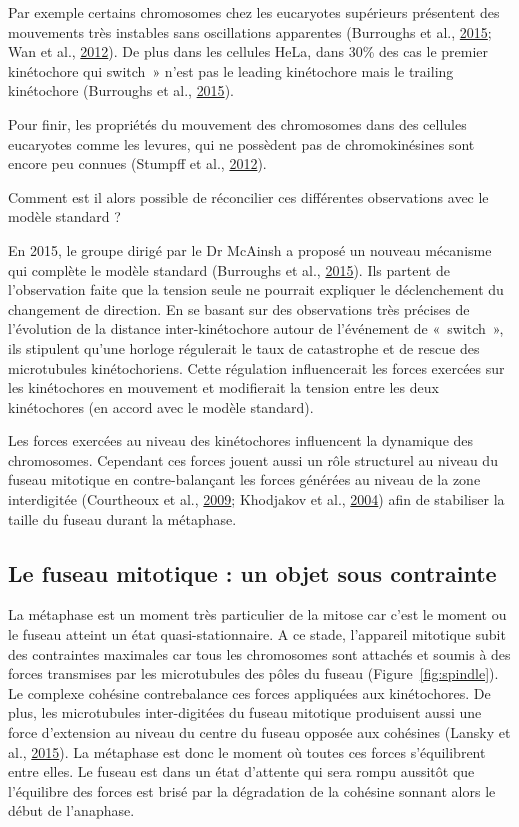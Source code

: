 \documentclass[12pt,a4paper,twoside,openright]{book}
\begin{document}
Par exemple certains chromosomes chez les eucaryotes supérieurs
présentent des mouvements très instables sans oscillations apparentes
(Burroughs et al., \protect\hyperlink{ref-Burroughs2015}{2015}; Wan et
al., \protect\hyperlink{ref-Wan2012}{2012}). De plus dans les cellules
HeLa, dans 30\% des cas le premier kinétochore qui switch~» n'est pas le
leading kinétochore mais le trailing kinétochore (Burroughs et al.,
\protect\hyperlink{ref-Burroughs2015}{2015}).

Pour finir, les propriétés du mouvement des chromosomes dans des
cellules eucaryotes comme les levures, qui ne possèdent pas de
chromokinésines sont encore peu connues (Stumpff et al.,
\protect\hyperlink{ref-Stumpff2012}{2012}).

Comment est il alors possible de réconcilier ces différentes
observations avec le modèle standard ?

En 2015, le groupe dirigé par le Dr McAinsh a proposé un nouveau
mécanisme qui complète le modèle standard (Burroughs et al.,
\protect\hyperlink{ref-Burroughs2015}{2015}). Ils partent de
l'observation faite que la tension seule ne pourrait expliquer le
déclenchement du changement de direction. En se basant sur des
observations très précises de l'évolution de la distance
inter-kinétochore autour de l'événement de «~switch~», ils stipulent
qu'une horloge régulerait le taux de catastrophe et de rescue des
microtubules kinétochoriens. Cette régulation influencerait les forces
exercées sur les kinétochores en mouvement et modifierait la tension
entre les deux kinétochores (en accord avec le modèle standard).

Les forces exercées au niveau des kinétochores influencent la dynamique
des chromosomes. Cependant ces forces jouent aussi un rôle structurel au
niveau du fuseau mitotique en contre-balançant les forces générées au
niveau de la zone interdigitée (Courtheoux et al.,
\protect\hyperlink{ref-Courtheoux2009}{2009}; Khodjakov et al.,
\protect\hyperlink{ref-Khodjakov2004}{2004}) afin de stabiliser la
taille du fuseau durant la métaphase.

\subsection{Le fuseau mitotique : un objet sous
contrainte}\label{le-fuseau-mitotique-un-objet-sous-contrainte}

La métaphase est un moment très particulier de la mitose car c'est le
moment ou le fuseau atteint un état quasi-stationnaire. A ce stade,
l'appareil mitotique subit des contraintes maximales car tous les
chromosomes sont attachés et soumis à des forces transmises par les
microtubules des pôles du fuseau (Figure~\ref{fig:spindle}). Le complexe
cohésine contrebalance ces forces appliquées aux kinétochores. De plus,
les microtubules inter-digitées du fuseau mitotique produisent aussi une
force d'extension au niveau du centre du fuseau opposée aux cohésines
(Lansky et al., \protect\hyperlink{ref-Lansky2015}{2015}). La métaphase
est donc le moment où toutes ces forces s'équilibrent entre elles. Le
fuseau est dans un état d'attente qui sera rompu aussitôt que
l'équilibre des forces est brisé par la dégradation de la cohésine
sonnant alors le début de l'anaphase.
\end{document}

